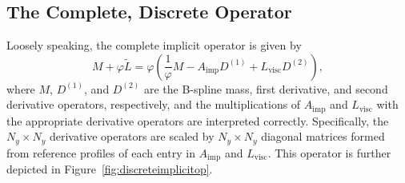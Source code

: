 \subsection{The Complete, Discrete Operator}
Loosely speaking, the complete implicit operator is given by
%
\begin{equation*}
M + \varphi \tilde{L} = \varphi \left( \frac{1}{\varphi} M - A_{\mathrm{imp}} D^{(1)} + L_{\mathrm{visc}} D^{(2)} \right),
\end{equation*}
% 
where $M$, $D^{(1)}$, and $D^{(2)}$ are the B-spline mass, first
derivative, and second derivative operators, respectively, and the
multiplications of $A_{\mathrm{imp}}$ and $L_{\mathrm{visc}}$ with the
appropriate derivative operators are interpreted correctly.
Specifically, the $N_y \times N_y$ derivative operators are scaled by
$N_y \times N_y$ diagonal matrices formed from reference profiles of
each entry in $A_{\mathrm{imp}}$ and $L_{\mathrm{visc}}$.  This
operator is further depicted in Figure~\ref{fig:discreteimplicitop}.

